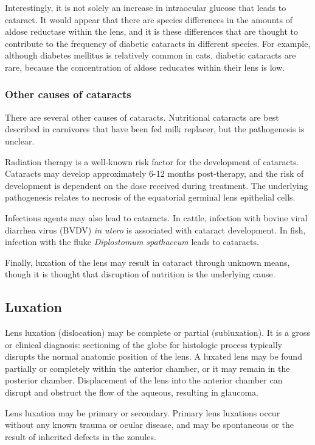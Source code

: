 \documentclass[openany]{article}
\begin{document}
Interestingly, it is not solely an increase in intraocular glucose that
leads to cataract. It would appear that there are species differences in
the amounts of aldose reductase within the lens, and it is these
differences that are thought to contribute to the frequency of diabetic
cataracts in different species. For example, although diabetes mellitus
is relatively common in cats, diabetic cataracts are rare, because the
concentration of aldose reducates within their lens is low.

\subsubsection{Other causes of
cataracts}\label{other-causes-of-cataracts}

There are several other causes of cataracts. Nutritional cataracts are
best described in carnivores that have been fed milk replacer, but the
pathogenesis is unclear.

Radiation therapy is a well-known risk factor for the development of
cataracts. Cataracts may develop approximately 6-12 months post-therapy,
and the risk of development is dependent on the dose received during
treatment. The underlying pathogenesis relates to necrosis of the
equatorial germinal lens epithelial cells.

Infectious agents may also lead to cataracts. In cattle, infection with
bovine viral diarrhea virus (BVDV) \emph{in utero} is associated with
cataract development. In fish, infection with the fluke
\emph{Diplostomum spathaceum} leads to cataracts.

Finally, luxation of the lens may result in cataract through unknown
means, though it is thought that disruption of nutrition is the
underlying cause.

\subsection{Luxation}\label{luxation}

Lens luxation (dislocation) may be complete or partial (subluxation). It
is a gross or clinical diagnosis: sectioning of the globe for histologic
process typically disrupts the normal anatomic position of the lens. A
luxated lens may be found partially or completely within the anterior
chamber, or it may remain in the posterior chamber. Displacement of the
lens into the anterior chamber can disrupt and obstruct the flow of the
aqueous, resulting in glaucoma.

Lens luxation may be primary or secondary. Primary lens luxations occur
without any known trauma or ocular disease, and may be spontaneous or
the result of inherited defects in the zonules.
\end{document}
